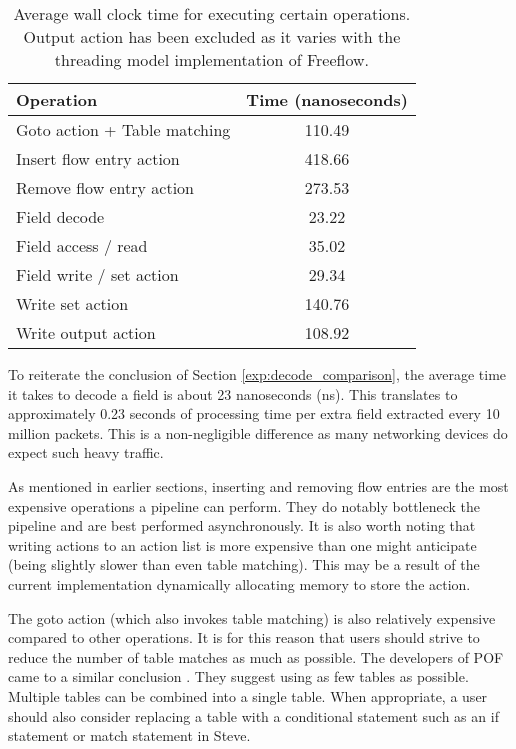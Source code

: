 \begin{table}[ht]
\caption{Average wall clock time for executing certain operations. Output action has been excluded as it varies with the threading model implementation of Freeflow.}
\begin{center}
\begin{tabularx}{\linewidth}{| X || c | }
\hline
Operation & Time (nanoseconds)  \\
\hline
Goto action + Table matching & 110.49 \\
\hline
Insert flow entry action & 418.66 \\
\hline
Remove flow entry action & 273.53 \\
\hline
Field decode & 23.22 \\
\hline
Field access / read & 35.02 \\
\hline
Field write / set action & 29.34 \\
\hline
Write set action &  140.76 \\
\hline
Write output action & 108.92 \\
\hline
\end{tabularx}
\end{center}
\label{tbl:action_stats}
\end{table}

To reiterate the conclusion of Section \ref{exp:decode_comparison}, the average time it takes to decode a field is about 23 nanoseconds (ns). This translates to approximately 0.23 seconds of processing time per extra field extracted every 10 million packets. This is a non-negligible difference as many networking devices do expect such heavy traffic.

As mentioned in earlier sections, inserting and removing flow entries are the most expensive operations a pipeline can perform. They do notably bottleneck the pipeline and are best performed asynchronously.
It is also worth noting that writing actions to an action list is more expensive than one might anticipate (being slightly slower than even table matching). This may be a result of the current implementation dynamically allocating memory to store the action.

The goto action (which also invokes table matching) is also relatively expensive compared to other operations. It is for this reason that users should strive to reduce the number of table matches as much as possible. The developers of POF came to a similar conclusion \cite{pof_impl} . They suggest using as few tables as possible. Multiple tables can be combined into a single table. When appropriate, a user should also consider replacing a table with a conditional statement such as an if statement or match statement in Steve.